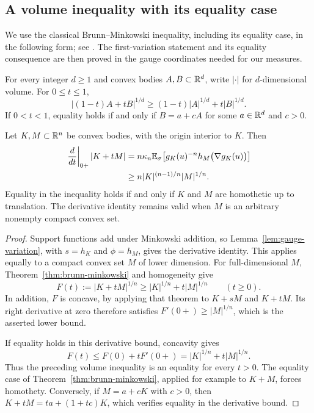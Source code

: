\subsection{A volume inequality with its equality case}

We use the classical Brunn--Minkowski inequality, including its equality
case, in the following form; see \cite[Sections~3 and~5]{Gardner2002}.
The first-variation statement and its equality consequence are then
proved in the gauge coordinates needed for our measures.

\begin{theorem}\label{thm:brunn-minkowski}
For every integer $d\ge1$ and convex bodies $A,B\subset\mathbb R^d$, write $|\cdot|$ for
$d$-dimensional volume. For $0\le t\le1$,
\begin{equation}\label{eq:brunn-minkowski}
 |(1-t)A+tB|^{1/d}
 \ge (1-t)|A|^{1/d}+t|B|^{1/d}.
\end{equation}
If $0<t<1$, equality holds if and only if $B=a+cA$ for some
$a\in\mathbb R^d$ and $c>0$.
\end{theorem}



\begin{corollary}\label{cor:volume-first-variation}
Let $K,M\subset\mathbb R^n$ be convex bodies, with the origin interior to
$K$.  Then
\begin{align}
 \left.\frac{d}{dt}\right|_{0+}|K+tM|
 &=n\kappa_n\mathbb E_{\sigma}\!\left[g_K(u)^{-n}
                 h_M\bigl(\nabla g_K(u)\bigr)\right]
                 \label{eq:minkowski-volume-derivative}\\
 &\ge n|K|^{(n-1)/n}|M|^{1/n}.\nonumber
\end{align}
Equality in the inequality holds if and only if $K$ and $M$ are
homothetic up to translation.  The derivative identity remains valid
when $M$ is an arbitrary nonempty compact convex set.
\end{corollary}

\begin{proof}
Support functions add under Minkowski addition, so
Lemma~\ref{lem:gauge-variation}, with $s=h_K$ and $\phi=h_M$,
gives the derivative identity.  This applies equally to a compact
convex set $M$ of lower dimension.  For full-dimensional $M$,
Theorem~\ref{thm:brunn-minkowski} and homogeneity give
\[
 F(t):=|K+tM|^{1/n}\ge |K|^{1/n}+t|M|^{1/n}
 \qquad(t\ge0).
\]
In addition, $F$ is concave, by applying that theorem to $K+sM$
and $K+tM$.  Its right derivative at zero therefore satisfies
$F'(0+)\ge |M|^{1/n}$, which is the asserted lower bound.

If equality holds in this derivative bound, concavity gives
\[
 F(t)\le F(0)+tF'(0+)=|K|^{1/n}+t|M|^{1/n}.
\]
Thus the preceding volume inequality is an equality for every $t>0$.
The equality case of Theorem~\ref{thm:brunn-minkowski}, applied for
example to $K+M$, forces homothety.  Conversely, if $M=a+cK$
with $c>0$, then $K+tM=ta+(1+tc)K$, which verifies equality in
the derivative bound.
\end{proof}

